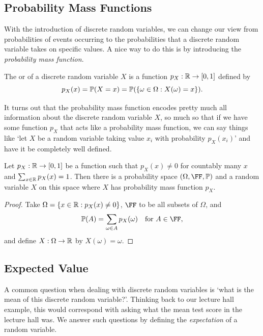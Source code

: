 \documentclass[a4paper]{scrartcl}
\begin{document}

\subsection{Probability Mass Functions}

With the introduction of discrete random variables, we can change our view from probabilities of events occurring to the probabilities that a discrete random variable takes on specific values. A nice way to do this is by introducing the \emph{probability mass function}.

\begin{definition}
	The  or  of a discrete random variable $X$ is a function $p_X: \mathbb{R} \rightarrow [0, 1]$ defined by
	$$
	p_X(x) = \mathbb{P}(X = x) = \mathbb{P}(\{ \omega \in \Omega : X(\omega) = x\}).
	$$
\end{definition}

It turns out that the probability mass function encodes pretty much all information about the discrete random variable $X$, so much so that if we have some function $p_X$ that acts like a probability mass function, we can say things like `let $X$ be a random variable taking value $x_i$ with probability $p_X(x_i)$' and have it be completely well defined.

\begin{theorem}
	Let $p_X : \mathbb{R} \rightarrow [0, 1]$ be a function such that $p_X(x) \neq 0$ for countably many $x$ and $\sum_{x \in \mathbb{R}} p_X(x) = 1$. Then there is a probability space $(\Omega, \FF, \PP)$ and a random variable $X$ on this space where $X$ has probability mass function $p_X$.
\end{theorem}
\begin{proof}
	Take $\Omega = \{x \in \mathbb{R} : p_X(x) \neq 0\}$, $\FF$ to be all subsets of $\Omega$, and 
	$$
	\PP(A) = \sum_{\omega \in A} p_X(\omega) \quad \text{for }A \in \FF,
	$$
	and define $X : \Omega \rightarrow \mathbb{R}$ by $X(\omega) = \omega$.
\end{proof}


\subsection{Expected Value}

A common question when dealing with discrete random variables is `what is the mean of this discrete random variable?'. Thinking back to our 
lecture hall example, this would correspond with asking what the mean test score in the lecture hall was.
We answer such questions by defining the \emph{expectation} of a random variable.
\end{document}
